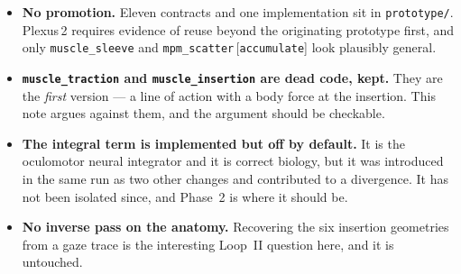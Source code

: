 \documentclass[11pt,a4paper]{article}
\newcommand{\code}[1]{\texttt{#1}}
\begin{document}
\begin{itemize}
\item \textbf{No promotion.} Eleven contracts and one implementation sit in \code{prototype/}.
Plexus\,2 requires evidence of reuse beyond the originating prototype first, and only
\code{muscle\_sleeve} and \code{mpm\_scatter}\,[\code{accumulate}] look plausibly general.
\item \textbf{\code{muscle\_traction} and \code{muscle\_insertion} are dead code, kept.} They are
the \emph{first} version --- a line of action with a body force at the insertion. This note argues
against them, and the argument should be checkable.
\item \textbf{The integral term is implemented but off by default.} It is the oculomotor neural
integrator and it is correct biology, but it was introduced in the same run as two other changes and
contributed to a divergence. It has not been isolated since, and Phase~2 is where it should be.
\item \textbf{No inverse pass on the anatomy.} Recovering the six insertion geometries from a gaze
trace is the interesting Loop~II question here, and it is untouched.
\end{itemize}
\end{document}
